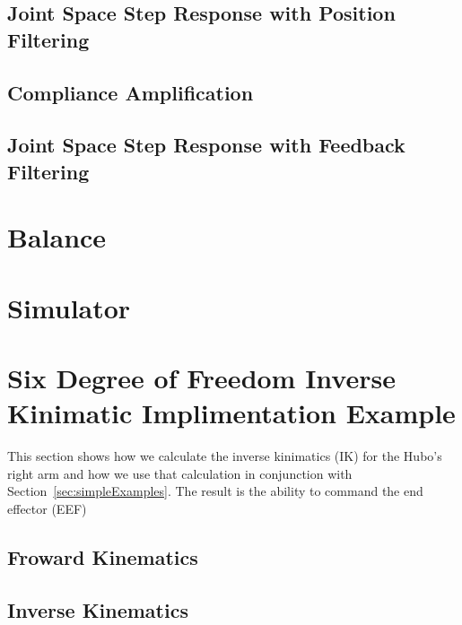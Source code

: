 	\subsection{Joint Space Step Response with Position Filtering}\label{sec:singlejointFilter}
		
	\subsection{Compliance Amplification}\label{sec:singlejointRefComplience}
		
	\subsection{Joint Space Step Response with Feedback Filtering}\label{sec:singlejointEnc}
		

\section{Balance}

\section{Simulator}\label{sec:simulator}
	


\section{Six Degree of Freedom Inverse Kinimatic Implimentation Example}\label{sec:6dofik}
This section shows how we calculate the inverse kinimatics (IK) for the Hubo's right arm and how we use that calculation in conjunction with Section~\ref{sec:simpleExamples}.  The result is the ability to command the end effector (EEF)


	\subsection{Froward Kinematics} 
		
	\subsection{Inverse Kinematics}\label{sec:ik}
			


